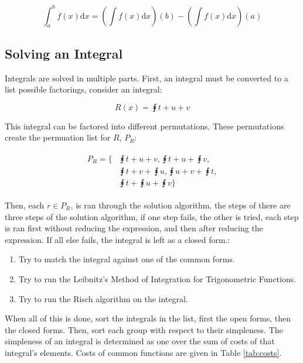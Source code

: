 \documentclass[11pt,a4paper]{book}
\begin{document}
\begin{equation}
\int_a^b f(x) \text{d}x = \left( \int f(x) \text{d}x \right)(b) - \left( \int f(x) \text{d}x \right)(a)
\end{equation}

\subsection{Solving an Integral}

Integrals are solved in multiple parts. First, an integral must be converted to a list possible factorings, consider an integral:

\begin{equation}
R(x) = \intx{t + u + v}
\end{equation}

This integral can be factored into different permutations. These permutations create the permuation list for $R$, $P_R$:

\begin{align}
\begin{split}
P_R =\Bigg\lbrace &\intx{t + u + v}, \intx{t + u} + \intx{v},\\
&\intx{t + v} + \intx{u}, \intx{u + v} + \intx{t},\\
&\intx{t} + \intx{u} + \intx{v} \Bigg\rbrace
\end{split}
\end{align}

Then, each $r \in P_R$, is ran through the solution algorithm, the steps of there are three steps of the solution algorithm, if one step fails, the other is tried, each step is ran first without reducing the expression, and then after reducing the expression. If all else fails, the integral is left as a closed form.:

\begin{enumerate}
\item Try to match the integral against one of the common forms.
\item Try to run the Leibnitz's Method of Integration for Trigonometric Functions.
\item Try to run the Risch algorithm on the integral.
\end{enumerate}

When all of this is done, sort the integrals in the list, first the open forms, then the closed forms. Then, sort each group with respect to their simpleness. The simpleness of an integral is determined as one over the sum of costs of that integral's elements. Costs of common functions are given in Table \ref{tab:costs}.
\end{document}
